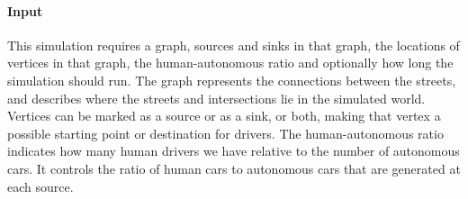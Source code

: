 \paragraph{Input}
\label{par:method:model:details:input}
This simulation requires a graph, sources and sinks in that graph, the locations of vertices in that graph, the human-autonomous ratio and optionally how long the simulation should run. The graph represents the connections between the streets, and describes where the streets and intersections lie in the simulated world. Vertices can be marked as a source or as a sink, or both, making that vertex a possible starting point or destination for drivers. The human-autonomous ratio indicates how many human drivers we have relative to the number of autonomous cars. It controls the ratio of human cars to autonomous cars that are generated at each source.
